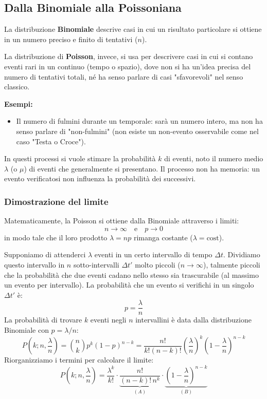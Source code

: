\documentclass[openany,a4paper,12pt]{book}
\theoremstyle{remark}
\begin{document}
\subsection*{Dalla Binomiale alla Poissoniana}
La distribuzione \textbf{Binomiale} descrive casi in cui un risultato particolare si ottiene in un numero preciso e finito di tentativi ($n$).

La distribuzione di \textbf{Poisson}, invece, si usa per descrivere casi in cui si contano eventi rari in un continuo (tempo o spazio), dove non si ha un'idea precisa del numero di tentativi totali, né ha senso parlare di casi "sfavorevoli" nel senso classico.

\textbf{Esempi:}
\begin{itemize}
    \item Il numero di fulmini durante un temporale: sarà un numero intero, ma non ha senso parlare di "non-fulmini" (non esiste un non-evento osservabile come nel caso "Testa o Croce").
\end{itemize}
In questi processi si vuole stimare la probabilità $k$ di eventi, noto il numero medio $\lambda$ (o $\mu$) di eventi che generalmente si presentano. Il processo non ha memoria: un evento verificatosi non influenza la probabilità dei successivi.

\subsubsection*{Dimostrazione del limite}
Matematicamente, la Poisson si ottiene dalla Binomiale attraverso i limiti:
\[
n \to \infty \quad \text{e} \quad p \to 0
\]
in modo tale che il loro prodotto $\lambda = np$ rimanga costante ($\lambda = \text{cost}$).

Supponiamo di attenderci $\lambda$ eventi in un certo intervallo di tempo $\Delta t$. Dividiamo questo intervallo in $n$ sotto-intervalli $\Delta t'$ molto piccoli ($n \to \infty$), talmente piccoli che la probabilità che due eventi cadano nello stesso sia trascurabile (al massimo un evento per intervallo).
La probabilità che un evento si verifichi in un singolo $\Delta t'$ è:
\[
p = \frac{\lambda}{n}
\]
La probabilità di trovare $k$ eventi negli $n$ intervallini è data dalla distribuzione Binomiale con $p = \lambda/n$:
\[
P\left(k; n, \frac{\lambda}{n}\right) = \binom{n}{k} p^k (1-p)^{n-k} = \frac{n!}{k!(n-k)!} \left(\frac{\lambda}{n}\right)^k \left(1 - \frac{\lambda}{n}\right)^{n-k}
\]
Riorganizziamo i termini per calcolare il limite:
\[
P\left(k; n, \frac{\lambda}{n}\right) = \frac{\lambda^k}{k!} \cdot \underbrace{\frac{n!}{(n-k)! \, n^k}}_{(A)} \cdot \underbrace{\left(1 - \frac{\lambda}{n}\right)^{n-k}}_{(B)}
\]
\end{document}
